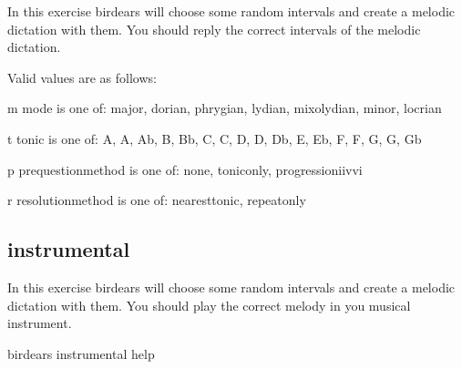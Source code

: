 \documentclass[letterpaper,10pt,english]{sphinxmanual}
\begin{document}
\begin{sphinxVerbatim}[commandchars=\\\{\}]
  In this exercise birdears will choose some random intervals and create a
  melodic dictation with them. You should reply the correct intervals of the
  melodic dictation.

  Valid values are as follows:

  \PYGZhy{}m \PYGZlt{}mode\PYGZgt{} is one of: major, dorian, phrygian, lydian, mixolydian, minor,
  locrian

  \PYGZhy{}t \PYGZlt{}tonic\PYGZgt{} is one of: A, A\PYGZsh{}, Ab, B, Bb, C, C\PYGZsh{}, D, D\PYGZsh{}, Db, E, Eb, F, F\PYGZsh{}, G,
  G\PYGZsh{}, Gb

  \PYGZhy{}p \PYGZlt{}prequestion\PYGZus{}method\PYGZgt{} is one of: none, tonic\PYGZus{}only, progression\PYGZus{}i\PYGZus{}iv\PYGZus{}v\PYGZus{}i

  \PYGZhy{}r \PYGZlt{}resolution\PYGZus{}method\PYGZgt{} is one of: nearest\PYGZus{}tonic, repeat\PYGZus{}only
\end{sphinxVerbatim}


\subsection{instrumental}
\label{\detokenize{index:instrumental}}
In this exercise birdears will choose some random intervals and create a
melodic dictation with them. You should play the correct melody in you
musical instrument.

%
\begin{sphinxVerbatim}[commandchars=\\\{\}]
birdears instrumental \PYGZhy{}\PYGZhy{}help
\end{sphinxVerbatim}
\end{document}
